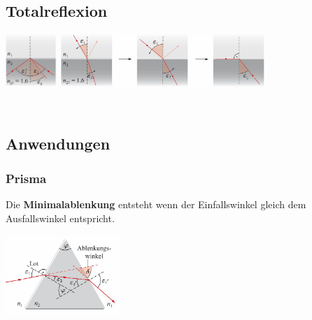 \subsection{Totalreflexion}

\begin{center}
	\begin{minipage}{0.1\textwidth}
	\end{minipage}%
	\begin{minipage}{0.5\textwidth}
		\includegraphics[height=2cm,keepaspectratio=true]{Images/totalreflexion.png}
		\includegraphics[height=2cm,keepaspectratio=true]{Images/einfallswinkel.png}
	\end{minipage}
\end{center}

 \\




\subsection{Anwendungen}
\subsubsection{Prisma}

Die \textbf{Minimalablenkung} entsteht wenn der Einfallswinkel gleich dem Ausfallswinkel entspricht.

\begin{center}
	\begin{minipage}{0.3\textwidth}
	
		
	\end{minipage}%
	\begin{minipage}{0.3\textwidth}
		\includegraphics[height=3cm,keepaspectratio=true]{Images/prisma.png}
	\end{minipage}
\end{center}

